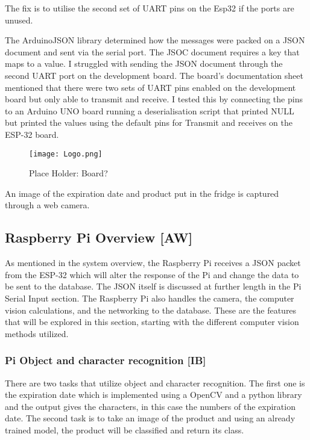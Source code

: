 The fix is to utilise the second set of UART pins on the Esp32 if the ports are unused.

The ArduinoJSON library determined how the messages were packed on a JSON document and sent via the serial port.
The JSOC document requires a key that maps to a value.
I struggled with sending the JSON document through the second UART port on the development board.
The board's documentation sheet mentioned that there were two sets of UART pins enabled on the development board but only able to transmit and receive.
I tested this by connecting the pins to an Arduino UNO board running a deserialisation script that printed NULL but printed the values using the default pins for Transmit and receives on the ESP-32 board.

\begin{figure}[H]        
    \centering
    \texttt{[image: Logo.png]}
    \caption{Place Holder: Board?}
    \label{fig:placeholder}
\end{figure} 

An image of the expiration date and product put in the fridge is captured through a web camera.

\subsection{Raspberry Pi Overview [AW]}

As mentioned in the system overview, the Raspberry Pi receives a JSON packet from the ESP-32 which will alter the response of the Pi and change the data to be sent to the database.
The JSON itself is discussed at further length in the Pi Serial Input section.
The Raspberry Pi also handles the camera, the computer vision calculations, and the networking to the database.
These are the features that will be explored in this section, starting with the different computer vision methods utilized.

\subsubsection{Pi Object and character recognition [IB]}

There are two tasks that utilize object and character recognition.
The first one is the expiration date which is implemented using a OpenCV and a python library and the output gives the characters, in this case the numbers of the expiration date.
The second task is to take an image of the product and using an already trained model, the product will be classified and return its class.
	

